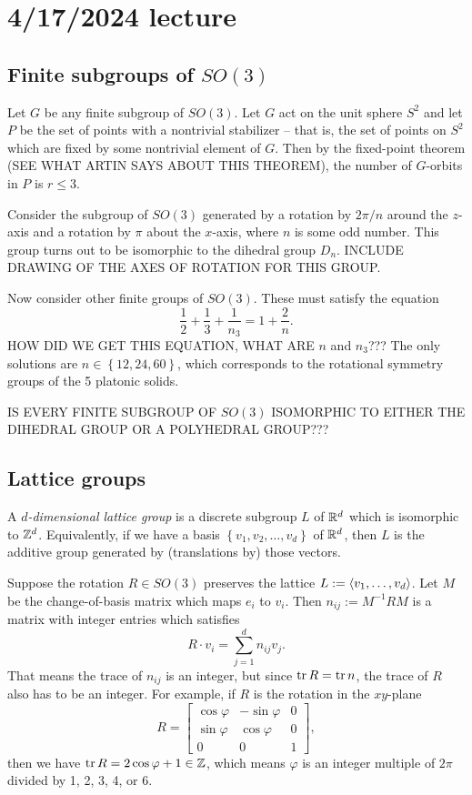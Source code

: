 \documentclass[class=article, crop=false]{standalone}
\begin{document}
\section{4/17/2024 lecture}

\subsection{Finite subgroups of $SO(3)$}
Let $G$ be any finite subgroup of $SO(3)$. Let $G$ act on the unit sphere $S^2$ and let $P$ be the set of points with a nontrivial stabilizer -- that is, the set of points on $S^2$ which are fixed by some nontrivial element of $G$. Then by the fixed-point theorem (SEE WHAT ARTIN SAYS ABOUT THIS THEOREM), the number of $G$-orbits in $P$ is $r\leq 3$.
\par
\begin{example}
    Consider the subgroup of $SO(3)$ generated by a rotation by $2 \pi / n$ around the $z$-axis and a rotation by $\pi$ about the $x$-axis, where $n$ is some odd number. This group turns out to be isomorphic to the dihedral group $D_n$. INCLUDE DRAWING OF THE AXES OF ROTATION FOR THIS GROUP.
\end{example}
\par
Now consider other finite groups of $SO(3)$. These must satisfy the equation
\[ \frac{1}{2} + \frac{1}{3} + \frac{1}{n_3} = 1 + \frac{2}{n}. \]
HOW DID WE GET THIS EQUATION, WHAT ARE $n$ and $n_3$???
The only solutions are $n \in \left\{ 12,24,60 \right\}$, which corresponds to the rotational symmetry groups of the 5 platonic solids.
\par
IS EVERY FINITE SUBGROUP OF $SO(3)$ ISOMORPHIC TO EITHER THE DIHEDRAL GROUP OR A POLYHEDRAL GROUP???

\subsection{Lattice groups}
A \emph{$d$-dimensional lattice group} is a discrete subgroup $L$ of $\mathbb{R}^d$ which is isomorphic to $\mathbb{Z}^d$. Equivalently, if we have a basis $ \left\{ v_1, v_2, \dots, v_d \right\}$ of $\mathbb{R}^d$, then $L$ is the additive group generated by (translations by) those vectors.
\par
Suppose the rotation $R \in SO(3)$ preserves the lattice $L := \left\langle v_1, \dots, v_d \right\rangle$. Let $M$ be the change-of-basis matrix which maps $e_i$ to $v_i$. Then $n_{ij} := M^{-1}RM$ is a matrix with integer entries which satisfies
\[ R \cdot v_i = \sum_{j=1}^d n_{ij} v_j. \]
That means the trace of $n_{ij}$ is an integer, but since $\operatorname{tr} R = \operatorname{tr} n$, the trace of $R$ also has to be an integer. For example, if $R$ is the rotation in the $xy$-plane
\[ R = \begin{bmatrix}
    \cos \varphi & - \sin \varphi & 0 \\
    \sin \varphi & \cos \varphi & 0 \\
    0 & 0 & 1
\end{bmatrix}, \]
then we have $\operatorname{tr} R = 2 \cos \varphi +1 \in \mathbb{Z}$, which means $\varphi$ is an integer multiple of $2 \pi$ divided by 1, 2, 3, 4, or 6.
\end{document}

